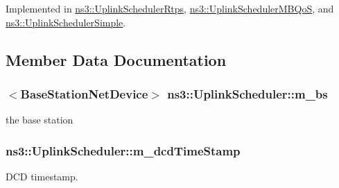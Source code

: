 Implemented in \hyperlink{classns3_1_1UplinkSchedulerRtps_ac44a9146c9928da245ebcf2c55a5c0d6}{ns3\+::\+Uplink\+Scheduler\+Rtps}, \hyperlink{classns3_1_1UplinkSchedulerMBQoS_aef30b9e41f2b8da83b467c6a8121b34d}{ns3\+::\+Uplink\+Scheduler\+M\+B\+QoS}, and \hyperlink{classns3_1_1UplinkSchedulerSimple_a88882b7e7a40a90dc2e9e7e1fb836004}{ns3\+::\+Uplink\+Scheduler\+Simple}.



\subsection{Member Data Documentation}
\subsubsection[{\texorpdfstring{m\+\_\+bs}{m_bs}}]{$<${\bf Base\+Station\+Net\+Device}$>$ ns3\+::\+Uplink\+Scheduler\+::m\+\_\+bs\hspace{0.3cm}{\ttfamily [private]}}\hypertarget{classns3_1_1UplinkScheduler_aa754e1206c67ab05e8b891c4a0ffe1fa}{}\label{classns3_1_1UplinkScheduler_aa754e1206c67ab05e8b891c4a0ffe1fa}


the base station 

\subsubsection[{\texorpdfstring{m\+\_\+dcd\+Time\+Stamp}{m_dcdTimeStamp}}]{ ns3\+::\+Uplink\+Scheduler\+::m\+\_\+dcd\+Time\+Stamp\hspace{0.3cm}{\ttfamily [private]}}\hypertarget{classns3_1_1UplinkScheduler_a6727690bc09cd88c0d0584bd6d649656}{}\label{classns3_1_1UplinkScheduler_a6727690bc09cd88c0d0584bd6d649656}


D\+CD timestamp. 

